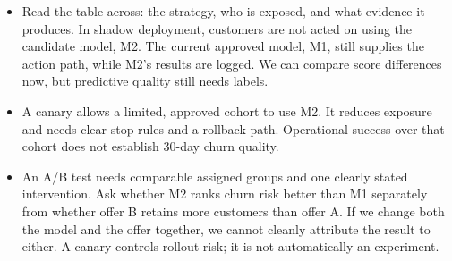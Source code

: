 \documentclass[11pt,a4paper]{article}
\begin{document}
\begin{examplebox}[title after break={SPOKEN SCRIPT --- slide 13 continued}]
\begin{itemize}
\item Read the table across: the strategy, who is exposed, and what evidence it produces. In shadow deployment, customers are not acted on using the candidate model, M2. The current approved model, M1, still supplies the action path, while M2's results are logged. We can compare score differences now, but predictive quality still needs labels.
\item A canary allows a limited, approved cohort to use M2. It reduces exposure and needs clear stop rules and a rollback path. Operational success over that cohort does not establish 30-day churn quality.
\item An A/B test needs comparable assigned groups and one clearly stated intervention. Ask whether M2 ranks churn risk better than M1 separately from whether offer B retains more customers than offer A. If we change both the model and the offer together, we cannot cleanly attribute the result to either. A canary controls rollout risk; it is not automatically an experiment.
\end{itemize}
\end{examplebox}
\par\noindent{\scriptsize\textcolor{teal!60!black}{Reading anchor: Breck et al., infra. tests 6–7 · Bank teaching application}}
\clearpage
\end{document}
